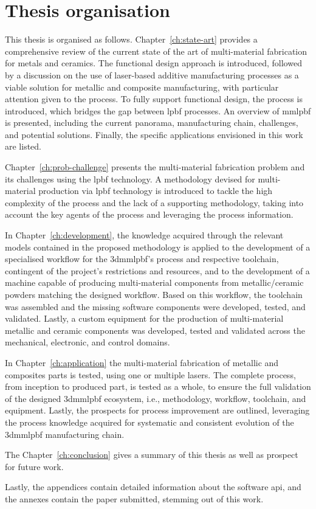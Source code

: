 \section{Thesis organisation}
This thesis is organised as follows.
Chapter~\ref{ch:state-art} provides a comprehensive review of the current state of the art of
multi-material fabrication for metals and ceramics. The functional design
approach is introduced, followed by a discussion on the use of laser-based
additive manufacturing processes as a viable solution for metallic and composite
manufacturing, with particular attention given to the  process. To
fully support functional design, the  process is introduced,
which bridges the gap between \gls{lpbf} processes. An overview of \gls{mmlpbf}
is presented, including the current panorama, manufacturing chain, challenges,
and potential solutions. Finally, the specific applications envisioned in this work are listed.

Chapter~\ref{ch:prob-challenge} presents the multi-material fabrication
problem and its challenges using the \gls{lpbf} technology. A methodology
devised for multi-material production via \gls{lpbf} technology is introduced to tackle the high complexity of the process
and the lack of a supporting methodology, taking into account the key agents of
the process and leveraging the process information.

In Chapter~\ref{ch:development}, the knowledge acquired through the relevant models contained
in the proposed methodology is applied to the development of a specialised
workflow for the \gls{3dmmlpbf}'s process and respective toolchain,
contingent of the project's restrictions and resources, and to the development
of a machine capable of producing multi-material components from
metallic/ceramic powders matching the designed workflow. Based on this workflow,
the toolchain was assembled and the missing software components were developed,
tested, and validated. Lastly, a custom equipment for the production of
multi-material metallic and ceramic components was developed, tested and
validated across the mechanical, electronic, and control domains.

In Chapter~\ref{ch:application} the multi-material
fabrication of metallic and composites parts is tested, using one or multiple
lasers. The complete process, from inception to produced part, is tested as a
whole, to ensure the full validation of the designed \gls{3dmmlpbf} ecosystem,
i.e., methodology, workflow, toolchain, and equipment.
Lastly, the prospects for process improvement are outlined, leveraging the
process knowledge acquired for systematic and consistent evolution of the
\gls{3dmmlpbf} manufacturing chain.

The Chapter~\ref{ch:conclusion} gives a summary of this thesis as well as
prospect for future work.

Lastly, the appendices contain detailed information about the software \gls{api}, and the annexes contain the paper submitted, stemming out of this work.
